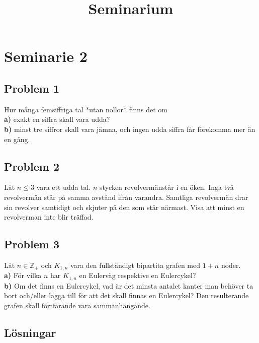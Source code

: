 \documentclass{article}
\title{Seminarium}
\begin{document}
    \section{Seminarie 2}
        \subsection{Problem 1}
            Hur många femsiffriga tal *utan nollor* finns det om\\
            \indent \textbf{a)} exakt en siffra skall vara udda?\\
            \indent \textbf{b)} minst tre siffror skall vara jämna, och ingen udda siffra får förekomma mer än en gång.
        
        \subsection{Problem 2}
            Låt $n\leq 3$ vara ett udda tal. $n$ stycken revolvermänstår i en öken. 
            Inga två revolvermän står på samma avstånd ifrån varandra. 
            Samtliga revolvermän drar sin revolver samtidigt och skjuter på den som står närmast. 
            Visa att minst en revolverman inte blir träffad.\\
        
        \subsection{Problem 3}
            Låt $n\in \mathbb{Z_{+}}$ och $K_{1,n}$ vara den fullständigt bipartita grafen med $1+n$ noder.\\
            \indent \textbf{a)} För vilka $n$ har $K_{1,n}$ en Eulerväg respektive en Eulercykel?\\
            \indent \textbf{b)} Om det finns en Eulercykel, 
            vad är det minsta antalet kanter man behöver ta bort och/eller lägga till för att det skall finnas en Eulercykel?
            Den resulterande grafen skall fortfarande vara sammanhängande.
        \clearpage
        \subsection{Lösningar}
\end{document}
